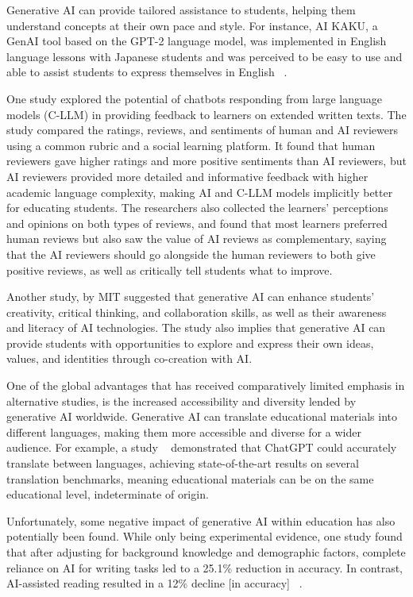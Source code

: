 \documentclass[a4paper,12pt]{report}
\begin{document}
Generative AI can provide tailored assistance to students, helping them understand concepts at their own pace and style. For instance, AI KAKU, a GenAI tool based on the GPT-2 language model, was implemented in English language lessons with Japanese students and was perceived to be easy to use and able to assist students to express themselves in English ~\cite{chan2023students}.

One study explored the potential of chatbots responding from large language models (C-LLM) in providing feedback to learners on extended written texts. The study compared the ratings, reviews, and sentiments of human and AI reviewers using a common rubric and a social learning platform. It found that human reviewers gave higher ratings and more positive sentiments than AI reviewers, but AI reviewers provided more detailed and informative feedback with higher academic language complexity, making AI and C-LLM models implicitly better for educating students. The researchers also collected the learners’ perceptions and opinions on both types of reviews, and found that most learners preferred human reviews but also saw the value of AI reviews as complementary, saying that the AI reviewers should go alongside the human reviewers to both give positive reviews, as well as critically tell students what to improve. ~\cite{genai-implications}

Another study, by MIT suggested that generative AI can enhance students’ creativity, critical thinking, and collaboration skills, as well as their awareness and literacy of AI technologies. The study also implies that generative AI can provide students with opportunities to explore and express their own ideas, values, and identities through co-creation with AI. ~\cite{ali2021exploring}

One of the global advantages that has received comparatively limited emphasis in alternative studies, is the increased accessibility and diversity lended by generative AI worldwide. Generative AI can translate educational materials into different languages, making them more accessible and diverse for a wider audience. For example, a study ~\cite{wu2016googles} demonstrated that ChatGPT could accurately translate between languages, achieving state-of-the-art results on several translation benchmarks, meaning educational materials can be on the same educational level, indeterminate of origin. ~\cite{article_1337500}

Unfortunately, some negative impact of generative AI within education has also potentially been found. While only being experimental evidence, one study found that after adjusting for background knowledge and demographic factors, complete reliance on AI for writing tasks led to a 25.1\% reduction in accuracy. In contrast, AI-assisted reading resulted in a 12\% decline [in accuracy] ~\cite{ju2023experimental}.
\end{document}
